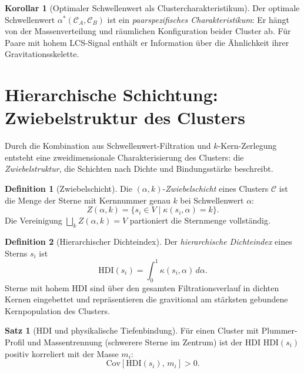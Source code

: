 ﻿\documentclass[a4paper,12pt]{report}
\theoremstyle{definition}
\newtheorem{definition}{Definition}
\newtheorem{satz}{Satz}
\newtheorem{korollar}{Korollar}
\begin{document}
\begin{korollar}[Optimaler Schwellenwert als Clustercharakteristikum]
\label{kor:opt_alpha}
Der optimale Schwellenwert $\alpha^*(\mathcal{C}_A, \mathcal{C}_B)$ ist ein \emph{paarspezifisches Charakteristikum}: Er hängt von der Massenverteilung und räumlichen Konfiguration beider Cluster ab. Für Paare mit hohem LCS-Signal enthält er Information über die Ähnlichkeit ihrer Gravitationsskelette.
\end{korollar}

\section{Hierarchische Schichtung: Zwiebelstruktur des Clusters}
\label{sec:zwiebelstruktur}

Durch die Kombination aus Schwellenwert-Filtration und $k$-Kern-Zerlegung entsteht eine zweidimensionale Charakterisierung des Clusters: die \emph{Zwiebelstruktur}, die Schichten nach Dichte und Bindungsstärke beschreibt.

\begin{definition}[Zwiebelschicht]
\label{def:zwiebelschicht}
Die $(\alpha, k)$-\emph{Zwiebelschicht} eines Clusters $\mathcal{C}$ ist die Menge der Sterne mit Kernnummer genau $k$ bei Schwellenwert $\alpha$:
\[
Z(\alpha, k) = \{s_i \in V \mid \kappa(s_i, \alpha) = k\}.
\]
Die Vereinigung $\bigsqcup_k Z(\alpha, k) = V$ partioniert die Sternmenge vollständig.
\end{definition}

\begin{definition}[Hierarchischer Dichteindex]
\label{def:dichteindex}
Der \emph{hierarchische Dichteindex} eines Sterns $s_i$ ist
\[
\mathrm{HDI}(s_i) = \int_0^1 \kappa(s_i, \alpha)\, d\alpha.
\]
Sterne mit hohem HDI sind über den gesamten Filtrationsverlauf in dichten Kernen eingebettet und repräsentieren die gravitional am stärksten gebundene Kernpopulation des Clusters.
\end{definition}

\begin{satz}[HDI und physikalische Tiefenbindung]
\label{satz:HDI}
Für einen Cluster mit Plummer-Profil und Massentrennung (schwerere Sterne im Zentrum) ist der HDI $\mathrm{HDI}(s_i)$ positiv korreliert mit der Masse $m_i$:
\[
\mathrm{Cov}[\mathrm{HDI}(s_i),\, m_i] > 0.
\]
\end{satz}
\end{document}

